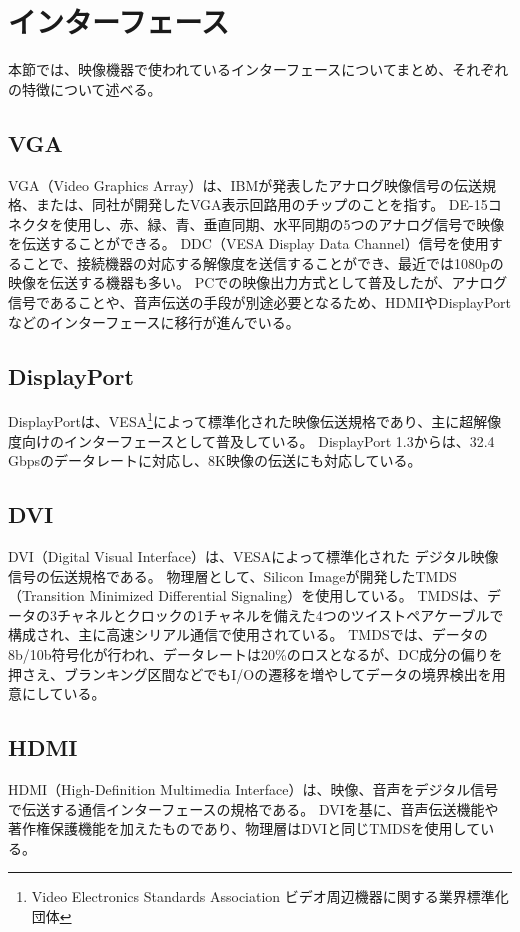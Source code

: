 \section{インターフェース}
\label{sec:interface}
本節では、映像機器で使われているインターフェースについてまとめ、それぞれの特徴について述べる。

\subsection{VGA}
VGA（Video Graphics Array）は、IBMが発表したアナログ映像信号の伝送規格、または、同社が開発したVGA表示回路用のチップのことを指す。
DE-15コネクタを使用し、赤、緑、青、垂直同期、水平同期の5つのアナログ信号で映像を伝送することができる。
DDC（VESA Display Data Channel）信号を使用することで、接続機器の対応する解像度を送信することができ、最近では1080pの映像を伝送する機器も多い。
PCでの映像出力方式として普及したが、アナログ信号であることや、音声伝送の手段が別途必要となるため、HDMIやDisplayPortなどのインターフェースに移行が進んでいる。

\subsection{DisplayPort}
DisplayPortは、VESA\footnote{Video Electronics Standards Association ビデオ周辺機器に関する業界標準化団体}によって標準化された映像伝送規格であり、主に超解像度向けのインターフェースとして普及している。
DisplayPort 1.3からは、32.4 Gbpsのデータレートに対応し、8K映像の伝送にも対応している。

\subsection{DVI}
DVI（Digital Visual Interface）は、VESA\footnotemark[1]によって標準化された デジタル映像信号の伝送規格である。
物理層として、Silicon Imageが開発したTMDS（Transition Minimized Differential Signaling）を使用している。
TMDSは、データの3チャネルとクロックの1チャネルを備えた4つのツイストペアケーブルで構成され、主に高速シリアル通信で使用されている。
TMDSでは、データの8b/10b符号化が行われ、データレートは20\%のロスとなるが、DC成分の偏りを押さえ、ブランキング区間などでもI/Oの遷移を増やしてデータの境界検出を用意にしている。

\subsection{HDMI}
HDMI（High-Definition Multimedia Interface）は、映像、音声をデジタル信号で伝送する通信インターフェースの規格である。
DVIを基に、音声伝送機能や著作権保護機能を加えたものであり、物理層はDVIと同じTMDSを使用している。

